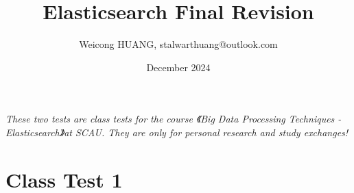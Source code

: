 \documentclass[]{exam}
\title{Elasticsearch Final Revision}
\author{Weicong HUANG, stalwarthuang@outlook.com}
\date{December 2024}
\begin{document}
\maketitle

\vspace{-2.5em} %
\begin{center}
\textit
{
These two tests are class tests for the course 《Big Data Processing Techniques - Elasticsearch》at SCAU. They are only for personal research and study exchanges!
}
\end{center}
\vspace{0.8em} 

\section{Class Test 1}
\end{document}
